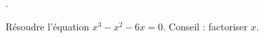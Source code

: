 
\begin{exercice}\cite{yegufS}.\label{exoPremiere-0043}

    Résoudre l'équation \( x^3-x^2-6x=0\). Conseil : factoriser \( x\). 


\end{exercice}
